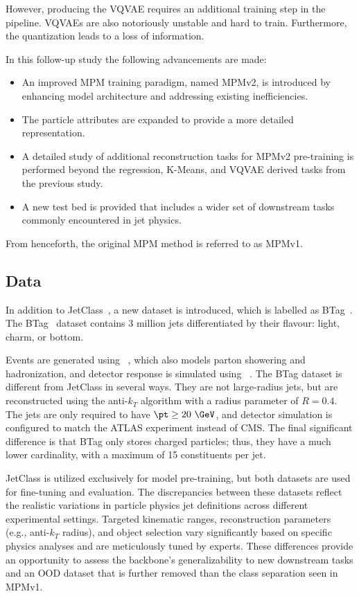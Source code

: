 However, producing the VQVAE requires an additional training step in the pipeline.
VQVAEs are also notoriously unstable and hard to train.
Furthermore, the quantization leads to a loss of information.

In this follow-up study the following advancements are made:
\begin{itemize}
    \item An improved MPM training paradigm, named MPMv2, is introduced by enhancing model architecture and addressing existing inefficiencies.
    \item The particle attributes are expanded to provide a more detailed representation.
    \item A detailed study of additional reconstruction tasks for MPMv2 pre-training is performed beyond the regression, K-Means, and VQVAE derived tasks from the previous study.
    \item A new test bed is provided that includes a wider set of downstream tasks commonly encountered in jet physics.
\end{itemize}
From henceforth, the original MPM method is referred to as MPMv1.

\subsection{Data}

In addition to JetClass~\cite{JetClass}, a new dataset is introduced, which is labelled as BTag~\cite{btag}.
The BTag~\cite{btag} dataset contains 3 million jets differentiated by their flavour: light, charm, or bottom.

Events are generated using \pythia~\cite{Pythia8}, which also models parton showering and hadronization, and detector response is simulated using \delphes~\cite{Delphes}.
The BTag dataset is different from JetClass in several ways.
They are not large-radius jets, but are reconstructed using the anti-$k_T$ algorithm with a radius parameter of $R=0.4$.
The jets are only required to have $\pt \geq 20~\GeV$, and detector simulation is configured to match the ATLAS experiment instead of CMS.
The final significant difference is that BTag only stores charged particles; thus, they have a much lower cardinality, with a maximum of 15 constituents per jet.

JetClass is utilized exclusively for model pre-training, but both datasets are used for fine-tuning and evaluation.
The discrepancies between these datasets reflect the realistic variations in particle physics jet definitions across different experimental settings.
Targeted kinematic ranges, reconstruction parameters (e.g., anti-$k_T$ radius), and object selection vary significantly based on specific physics analyses and are meticulously tuned by experts.
These differences provide an opportunity to assess the backbone's generalizability to new downstream tasks and an OOD dataset that is further removed than the class separation seen in MPMv1.

